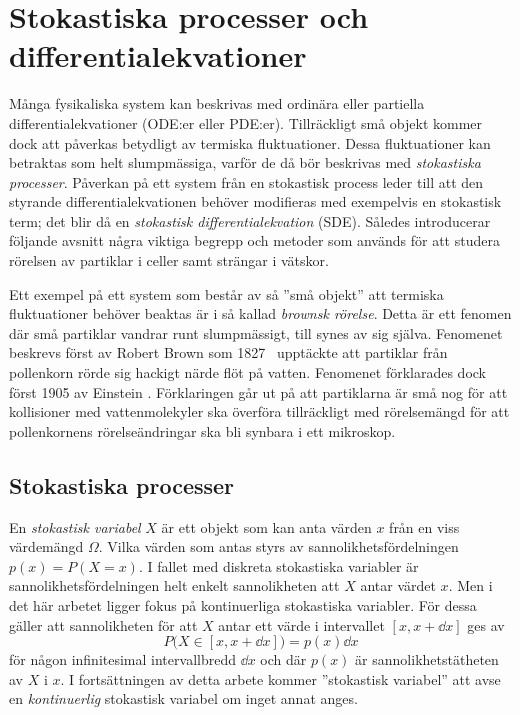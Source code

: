 \chapter{Stokastiska processer och differentialekvationer}

Många fysikaliska system kan beskrivas med ordinära eller partiella differential\-ekvationer (ODE:er
eller PDE:er). Tillräckligt små objekt kommer dock att påverkas betydligt av termiska fluktuationer. Dessa fluktuationer kan betraktas som helt slumpmässiga, varför de då bör beskrivas med \emph{stokastiska processer}. Påverkan på ett system från en stokastisk process leder till att den styrande differentialekvationen behöver modifieras med exempelvis en stokastisk term; det blir då en \emph{stokastisk differentialekvation} (SDE).  Således introducerar följande avsnitt några viktiga begrepp och metoder som används för att studera rörelsen av partiklar i celler samt strängar i vätskor. 

Ett exempel på ett system som består av så ''små objekt'' att termiska
fluktuationer behöver beaktas är i så kallad \emph{brownsk rörelse}. 
Detta är ett fenomen där små partiklar vandrar runt slumpmässigt, till synes av sig själva. Fenomenet beskrevs först av Robert Brown som 1827~\cite{Brown1828} upptäckte att partiklar från pollenkorn rörde sig hackigt närde flöt på vatten. Fenomenet förklarades dock först 1905 av Einstein \cite{Einstein1905}. Förklaringen går ut på att partiklarna är små nog för att kollisioner med vattenmolekyler ska överföra tillräckligt med rörelsemängd för att pollenkornens rörelseändringar ska bli synbara i ett mikroskop. 


\section{Stokastiska processer}
En \emph{stokastisk variabel} $X$ är ett objekt som kan anta värden
$x$ från en viss värdemängd $\Omega$. Vilka värden som antas styrs av
sannolikhetsfördelningen $p(x)=P(X=x)$. I fallet med diskreta stokastiska
variabler är sannolikhetsfördelningen helt enkelt sannolikheten att
$X$ antar värdet $x$. Men i det här arbetet ligger fokus på
kontinuerliga stokastiska variabler. För dessa gäller att sannolikheten för att $X$ antar ett värde i intervallet $[x, x+\dd{x}]$ ges av
\begin{equation}
P\big( X\in[x, x+\dd{x}] \big) =p(x)\dd{x}
\end{equation}
för någon infinitesimal intervallbredd $\dd{x}$ och där $p(x)$ är sannolikhetstätheten av $X$ i $x$. 
I fortsättningen av detta arbete kommer ''stokastisk variabel'' att avse en \emph{kontinuerlig} stokastisk variabel om inget annat anges.


